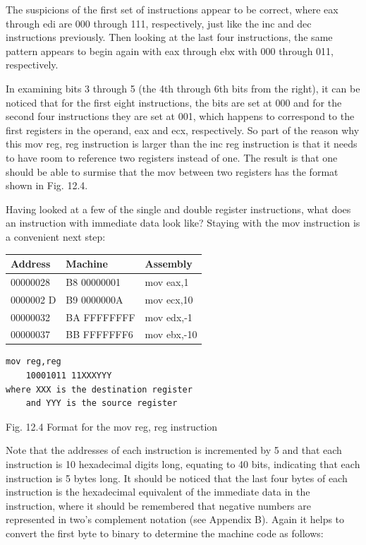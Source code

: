 \documentclass[10pt]{book}
\begin{document}
The suspicions of the first set of instructions appear to be correct, where eax through edi are 000 through 111, respectively, just like the inc and dec instructions previously. Then looking at the last four instructions, the same pattern appears to begin again with eax through ebx with 000 through 011, respectively.

In examining bits 3 through 5 (the 4th through 6th bits from the right), it can be noticed that for the first eight instructions, the bits are set at 000 and for the second four instructions they are set at 001, which happens to correspond to the first registers in the operand, eax and ecx, respectively. So part of the reason why this mov reg, reg instruction is larger than the inc reg instruction is that it needs to have room to reference two registers instead of one. The result is that one should be able to surmise that the mov between two registers has the format shown in Fig. 12.4.

Having looked at a few of the single and double register instructions, what does an instruction with immediate data look like? Staying with the mov instruction is a convenient next step:

\begin{center}
\begin{tabular}{|l|l|l|}
\hline
Address & Machine & Assembly \\
\hline
00000028 & B8 00000001 & mov eax,1 \\
\hline
0000002 D & B9 0000000A & mov ecx,10 \\
\hline
00000032 & BA FFFFFFFF & mov edx,-1 \\
\hline
00000037 & BB FFFFFFF6 & mov ebx,-10 \\
\hline
\end{tabular}
\end{center}

\begin{verbatim}
mov reg,reg
    10001011 11XXXYYY
where XXX is the destination register
    and YYY is the source register
\end{verbatim}

Fig. 12.4 Format for the mov reg, reg instruction

Note that the addresses of each instruction is incremented by 5 and that each instruction is 10 hexadecimal digits long, equating to 40 bits, indicating that each instruction is 5 bytes long. It should be noticed that the last four bytes of each instruction is the hexadecimal equivalent of the immediate data in the instruction, where it should be remembered that negative numbers are represented in two's complement notation (see Appendix B). Again it helps to convert the first byte to binary to determine the machine code as follows:
\end{document}
